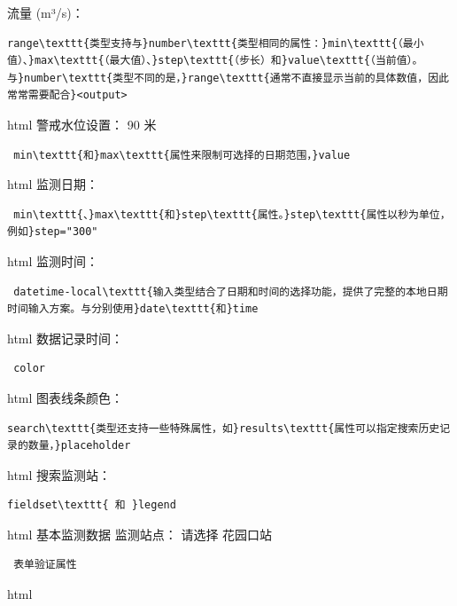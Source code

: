 流量 (m³/s)： \begin{lstlisting}
range\texttt{类型支持与}number\texttt{类型相同的属性：}min\texttt{（最小值）、}max\texttt{（最大值）、}step\texttt{（步长）和}value\texttt{（当前值）。与}number\texttt{类型不同的是，}range\texttt{通常不直接显示当前的具体数值，因此常常需要配合}<output>
\end{lstlisting} html 警戒水位设置： 90 米 \begin{lstlisting} min\texttt{和}max\texttt{属性来限制可选择的日期范围，}value \end{lstlisting} html
监测日期： \begin{lstlisting} min\texttt{、}max\texttt{和}step\texttt{属性。}step\texttt{属性以秒为单位，例如}step="300" \end{lstlisting}
html 监测时间： \begin{lstlisting} datetime-local\texttt{输入类型结合了日期和时间的选择功能，提供了完整的本地日期时间输入方案。与分别使用}date\texttt{和}time
\end{lstlisting} html 数据记录时间： \begin{lstlisting} color \end{lstlisting} html 图表线条颜色： \begin{lstlisting}
search\texttt{类型还支持一些特殊属性，如}results\texttt{属性可以指定搜索历史记录的数量，}placeholder \end{lstlisting} html 搜索监测站： \begin{lstlisting}
fieldset\texttt{ 和 }legend \end{lstlisting} html 基本监测数据 监测站点： 请选择 花园口站 \begin{lstlisting} 表单验证属性 \end{lstlisting} html
